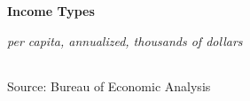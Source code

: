 \documentclass{report}
\begin{document}
\begin{minipage}{0.76\textwidth}

\normalsize \textbf{Income Types}

\footnotesize{\textit{per capita, annualized, thousands of dollars}}

\hspace{-2mm}  \setlength{\tabcolsep}{3.7pt} \color{black!90}
		{\renewcommand{\arraystretch}{1.6}
		 \begin{tabular}{p{54mm} R{13mm} R{13mm} R{13mm} R{13mm}}
			 \hline
		\end{tabular}}
\vspace{1mm}

\footnotesize{Source: Bureau of Economic Analysis}
\end{minipage}
\newpage
\end{document}
